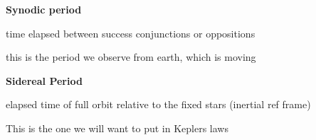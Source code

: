 \documentclass{article}
\begin{document}
\textbf{\large Synodic period }

\begin{list}{-}{}
\item time elapsed between success conjunctions or oppositions
\item this is the period we observe from earth, which is moving
\end{list}
\noindent
\textbf{\large Sidereal Period} 
\begin{list}{-}{}
\item elapsed time of full orbit relative to the fixed stars (inertial ref frame)
\item This is the one we will want to put in Keplers laws
\end{list}
\end{document}
